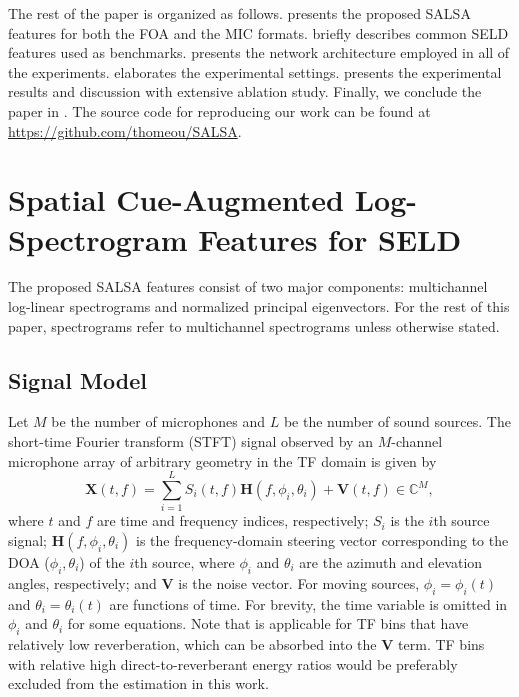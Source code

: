 \documentclass[journal]{IEEEtran}
\begin{document}
The rest of the paper is organized as follows.  presents the proposed SALSA features for both the FOA and the MIC formats.  briefly describes common SELD features used as benchmarks.  presents the network architecture employed in all of the experiments.  elaborates the experimental settings.  presents the experimental results and discussion with extensive ablation study. Finally, we conclude the paper in . The source code for reproducing our work can be found at \href{https://github.com/thomeou/SALSA}{https://github.com/thomeou/SALSA}. \section{Spatial Cue-Augmented Log-Spectrogram Features for SELD}
\label{sec:salsa}

The proposed SALSA features consist of two major components: multichannel log-linear spectrograms and normalized principal eigenvectors. For the rest of this paper, spectrograms refer to multichannel spectrograms unless otherwise stated. 

\subsection{Signal Model}
\label{sec:signal_model}

Let $M$ be the number of microphones and $L$ be the number of sound sources. 
The short-time Fourier transform (STFT) signal observed by an $M$-channel microphone array of arbitrary geometry in the TF domain is given by 
\begin{equation}
    \mathbf{X}(t,f)=\sum_{i=1}^{L} S_i(t,f)\mathbf{H}(f,\phi_i,\theta_i) + \mathbf{V}(t,f) \in\mathbb{C}^M,
    \label{eq:stft_signal_model}
\end{equation}
where $t$ and $f$ are time and frequency indices, respectively; $S_i$ is the $i$th source signal; $\mathbf{H}(f,\phi_i, \theta_i)$ is the frequency-domain steering vector corresponding to the DOA ($\phi_i,\theta_i$) of the $i$th source, where $\phi_i$ and $\theta_i$ are the azimuth and elevation angles, respectively; and $\mathbf{V}$ is the noise vector. For moving sources, $\phi_i=\phi_i(t)$ and $\theta_i=\theta_i(t)$ are functions of time. For brevity, the time variable is omitted in $\phi_i$ and $\theta_i$ for some equations. Note that  is applicable for TF bins that have relatively low reverberation, which can be absorbed into the $\mathbf{V}$ term. TF bins with relative high direct-to-reverberant energy ratios would be preferably excluded from the estimation in this work. 
\end{document}
